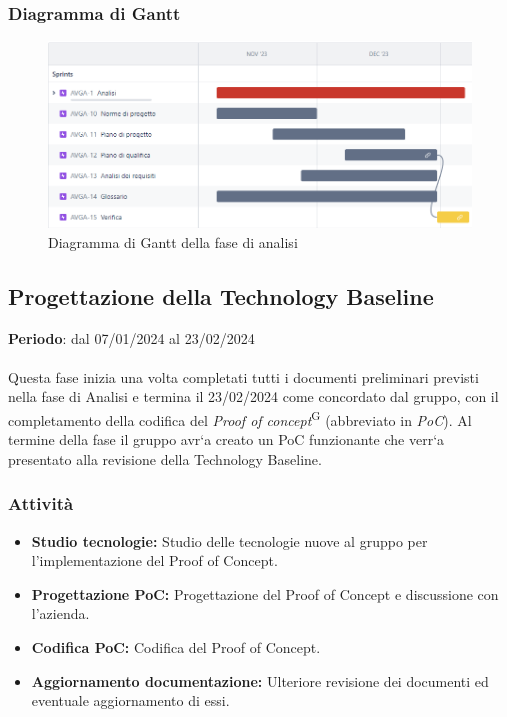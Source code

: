 \newpage 
\subsubsection{Diagramma di Gantt}\label{sec:pianificazione:analisi:gantt}

\begin{figure}[H]
    \centering
    \includegraphics[width=1\textwidth]{images/gantt_analisi.PNG}
    \caption{Diagramma di Gantt della fase di analisi}
    \label{fig:gantt_analisi}
\end{figure}


\subsection{Progettazione della Technology Baseline}\label{sec:pianificazione:progRTB}

\textbf{Periodo}: dal 07/01/2024 al 23/02/2024\\\\
Questa fase inizia una volta completati tutti i documenti preliminari previsti nella fase di Analisi e termina il 23/02/2024 come concordato dal gruppo, con il completamento della codifica del \textit{Proof of concept}\textsuperscript{G} (abbreviato in \textit{PoC}). Al termine della fase il gruppo avr`a creato un PoC funzionante che verr`a presentato alla revisione della Technology Baseline.

\subsubsection{Attività}\label{sec:pianificazione:progRTB:attivita}
\begin{itemize}
    \item \textbf{Studio tecnologie:} Studio delle tecnologie nuove al gruppo per l'implementazione del Proof of Concept.
    \item \textbf{Progettazione PoC:} Progettazione del Proof of Concept e discussione con l'azienda.
    \item \textbf{Codifica PoC:} Codifica del Proof of Concept.
    \item \textbf{Aggiornamento documentazione:} Ulteriore revisione dei documenti ed eventuale aggiornamento di essi.
\end{itemize}


